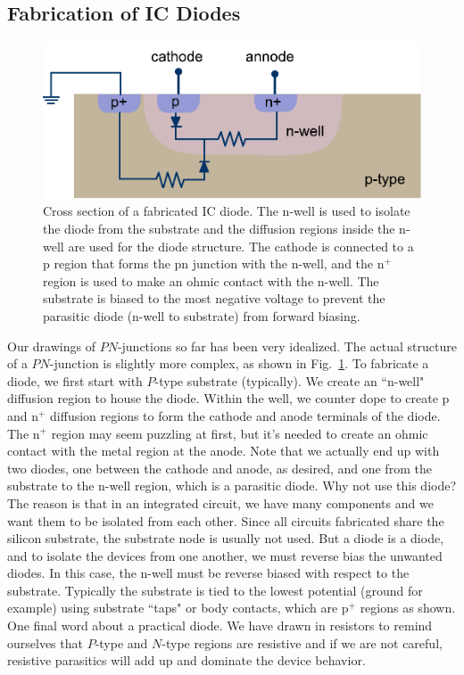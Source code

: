 \subsection{Fabrication of IC Diodes}
\begin{figure}[tb]
\centering
\includegraphics[width=.65\columnwidth]{slide44}
\caption{Cross section of a fabricated IC diode.  The n-well is used to isolate the diode from the substrate and the diffusion regions inside the n-well are used for the diode structure.  The cathode is connected to a p region that forms the pn junction with the n-well, and the n$^+$ region is used to make an ohmic contact with the n-well.  The substrate is biased to the most negative voltage to prevent the parasitic diode (n-well to substrate) from forward biasing.}
\label{fig:slide44}
\end{figure}
Our drawings of $PN$-junctions so far has been very idealized.  The actual structure of a $PN$-junction is slightly more complex, as shown in Fig.~\ref{fig:slide44}.  To fabricate a diode, we first start with $P$-type substrate (typically).  We create an ``n-well" diffusion region  to house the diode.  Within the well, we counter dope to create p and n$^+$ diffusion regions to form  the cathode and anode terminals of the diode.  The n$^+$ region may seem puzzling at first, but it's needed to create an ohmic contact with the metal region at the anode.  Note that we actually end up with two diodes, one between the cathode and anode, as desired, and one from the substrate to the n-well region, which is a parasitic diode.  Why not use this diode?  The reason is that in an integrated circuit, we have many components and we want them to be isolated from each other.  Since all circuits fabricated share the silicon substrate, the substrate node is usually not used.  But a diode is a diode, and to isolate the devices from one another, we must reverse bias the unwanted diodes.  In this case, the n-well must be reverse biased with respect to the substrate.  Typically the substrate is tied to the lowest potential (ground for example) using substrate ``taps" or body contacts, which are p$^+$ regions as shown.  One final word about a practical diode.  We have drawn in resistors to remind ourselves that $P$-type and $N$-type regions are resistive and if we are not careful, resistive parasitics will add up and dominate the device behavior.  
